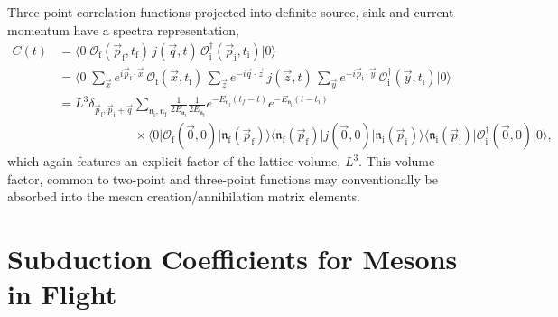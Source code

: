 Three-point correlation functions projected into definite source, sink and current momentum have a spectra representation,
\begin{align*}
C(t) 	&= 	\big\langle 0 \big| \mathcal{O}^{\,}_\mathrm{f}(\vec{p}_\mathrm{f}, t_\mathrm{f}) \,
			j(\vec{q}, t) \, 
			\mathcal{O}^\dag_\mathrm{i}(\vec{p}_\mathrm{i}, t_\mathrm{i}) \big| 0 \big\rangle \\
		&= \big\langle 0 \big| \sum\nolimits_{\vec{x}} e^{i \vec{p}_\mathrm{f}\cdot \vec{x} }\, \mathcal{O}^{\,}_\mathrm{f}(\vec{x}, t_\mathrm{f})\, 
		\sum\nolimits_{\vec{z}} e^{-i \vec{q} \cdot \vec{z} }\, j(\vec{z}, t)\,
		\sum\nolimits_{\vec{y}} e^{-i \vec{p}_\mathrm{i}\cdot \vec{y} }\, \mathcal{O}^{\dag}_\mathrm{i}(\vec{y}, t_\mathrm{i}) \big| 0 \big\rangle \\ 
		&= L^3 \delta_{\vec{p}_\mathrm{f} , \vec{p}_\mathfrak{i}+\vec{q}} \sum_{\mathfrak{n}_\mathrm{i},\mathfrak{n}_\mathrm{f} } \frac{1}{2 E_{\mathfrak{n}_\mathrm{i}} }\frac{1}{2 E_{\mathfrak{n}_\mathrm{f}} } 
		e^{-E_{\mathfrak{n}_\mathrm{f}} (t_f - t)} e^{-E_{\mathfrak{n}_\mathrm{i}} (t - t_i)} \;  
\\
		&\qquad\qquad\qquad\times\big\langle 0 \big| \mathcal{O}_\mathrm{f}(\vec{0}, 0) \big| \mathfrak{n}_\mathrm{f}(\vec{p}_\mathrm{f}) \big\rangle
		\big\langle \mathfrak{n}_\mathrm{f}(\vec{p}_\mathrm{f}) \big| j(\vec{0},0) \big| \mathfrak{n}_\mathrm{i}(\vec{p}_\mathrm{i}) \big\rangle
		\big\langle \mathfrak{n}_\mathrm{i}(\vec{p}_\mathrm{i}) \big| \mathcal{O}^\dag_\mathrm{i}(\vec{0}, 0) \big| 0\big\rangle,	
\end{align*}
which again features an explicit factor of the lattice volume, $L^3$. This volume factor, common to two-point and three-point functions may conventionally be absorbed into the meson creation/annihilation matrix elements.





\section{Subduction Coefficients for Mesons in Flight }\label{app::Subduce}

